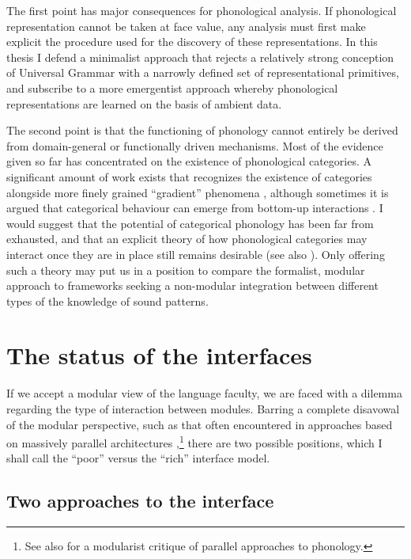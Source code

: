 The first point has major consequences for phonological analysis. If phonological representation cannot be taken at face value, any analysis must first make explicit the procedure used for the discovery of these representations. In this thesis I defend a minimalist approach that rejects a relatively strong conception of Universal Grammar with a narrowly defined set of representational primitives, and subscribe to a more emergentist approach whereby phonological representations are learned on the basis of ambient data.

The second point is that the functioning of phonology cannot entirely be derived from domain\hyp general or functionally driven mechanisms. Most of the evidence given so far has concentrated on the existence of phonological categories. A significant amount of work exists that recognizes the existence of categories alongside more finely grained \enquote{gradient} phenomena \citep[\cfm][]{pierrehumbert00:_concep}, although sometimes it is argued that categorical behaviour can emerge from bottom\hyp up interactions \citep[\egm][]{wedel}. I would suggest that the potential of categorical phonology has been far from exhausted, and that an explicit theory of how phonological categories may interact once they are in place still remains desirable (see also \citealt{cohn06:_is,cohn10:_labor_phonol,cohn11:_featur}). Only offering such a theory may put us in a position to compare the formalist, modular approach to frameworks seeking a non\hyp modular integration between different types of the knowledge of sound patterns.

\section{The status of the interfaces}
\label{sec:status-interfaces}

If we accept a modular view of the language faculty, we are faced with a dilemma regarding the type of interaction between modules. Barring a complete disavowal of the modular perspective, such as that often encountered in approaches based on massively parallel architectures \citep[\egm][]{rumelhart86:_paral,smolensky06:_harmon_mind},\footnote{See also \citet{scheer10:_guide_morph,scheer11:_issues} for a modularist critique of parallel approaches to phonology.} there are two possible positions, which I shall call the \enquote{poor} versus the \enquote{rich} interface model.

\subsection{Two approaches to the interface}
\label{sec:two-appr-interf}

